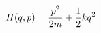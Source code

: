 \documentclass[preview]{standalone}
\begin{document}
\begin{align*}
\special{dvisvgm:raw <g id='unique000'>}H(q, p) = \frac{p^2}{2m} + \frac{1}{2}kq^2\special{dvisvgm:raw </g>}
\end{align*}
\end{document}
